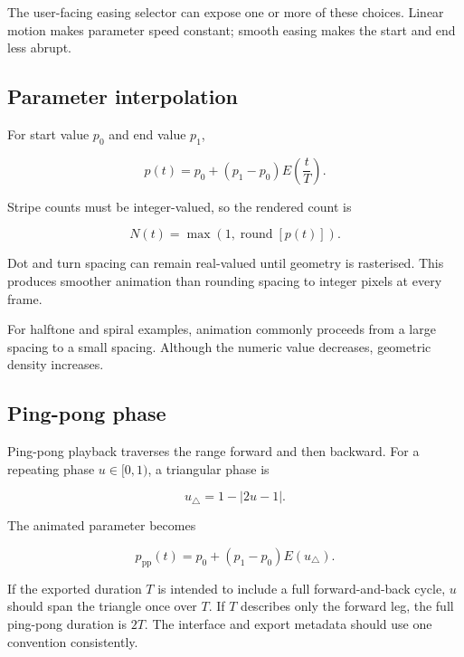 The user-facing easing selector can expose one or more of these choices. Linear motion makes parameter speed constant; smooth easing makes the start and end less abrupt.

\subsection{Parameter interpolation}

For start value $p_0$ and end value $p_1$,

\begin{equation}
p(t)=p_0+\left(p_1-p_0\right)E\!\left(\frac{t}{T}\right).
\label{eq:parameterinterp}
\end{equation}

Stripe counts must be integer-valued, so the rendered count is

\begin{equation}
N(t)=\max\!\left(1,\operatorname{round}[p(t)]\right).
\label{eq:integeranim}
\end{equation}

Dot and turn spacing can remain real-valued until geometry is rasterised. This produces smoother animation than rounding spacing to integer pixels at every frame.

For halftone and spiral examples, animation commonly proceeds from a large spacing to a small spacing. Although the numeric value decreases, geometric density increases.

\subsection{Ping-pong phase}

Ping-pong playback traverses the range forward and then backward. For a repeating phase $u\in[0,1)$, a triangular phase is

\begin{equation}
u_{\triangle}=1-\left|2u-1\right|.
\label{eq:trianglephase}
\end{equation}

The animated parameter becomes

\begin{equation}
p_{\mathrm{pp}}(t)=p_0+\left(p_1-p_0\right)E(u_{\triangle}).
\end{equation}

If the exported duration $T$ is intended to include a full forward-and-back cycle, $u$ should span the triangle once over $T$. If $T$ describes only the forward leg, the full ping-pong duration is $2T$. The interface and export metadata should use one convention consistently.

